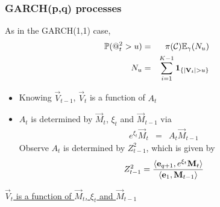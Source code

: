\documentclass{beamer}
\begin{document}
\begin{frame}
  \frametitle{GARCH(p,q) processes}
  As in the GARCH(1,1) case,
  \begin{eqnarray*}
    \mathbb{P}(@_t^2 > u) &=& \pi(\mathcal C) \mathbb{E}_\gamma(N_u) \\
    N_u &=& \sum_{i=1}^{K-1} \mathbf{1}_{\{|\mathbf{V}_t| > u\}}
  \end{eqnarray*}
  \begin{itemize}
  \item Knowing $\vec V_{t-1}$, $\vec V_t$ is a function of $A_t$
  \item $A_t$ is determined by $\vec M_t$, $\xi_t$ and $\vec M_{t-1}$ via
    \begin{eqnarray*}
      e^{\xi_t} \vec M_t &=& A_t \vec M_{t-1}
    \end{eqnarray*}
    Observe $A_t$ is determined by $Z_{t-1}^2$, which is given by
    \[
    Z_{t-1}^2 = {
      \langle\mathbf{e}_{q+1}, e^{\xi_t} \mathbf{M}_{t}\rangle
      \over
      \langle\mathbf{e}_{1}, \mathbf{M}_{t-1}\rangle
    }
    \]
  \end{itemize}
  \underline{$\vec V_t$ is a function of $\vec M_t$, $\xi_t$ and $\vec M_{t-1}$}
\end{frame}
\end{document}
